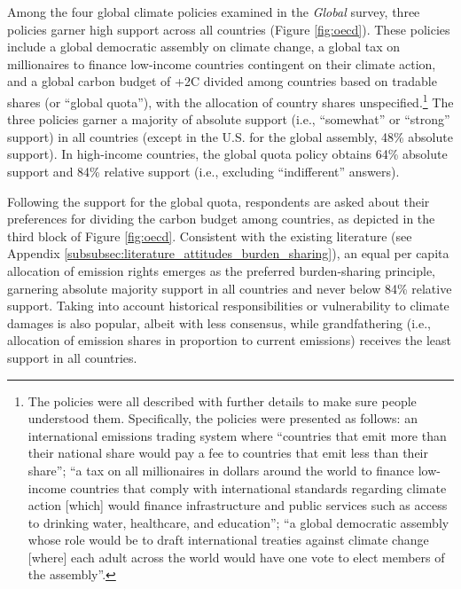Among the four global climate policies examined in the \textit{Global} survey, three policies garner high support across all countries (Figure \ref{fig:oecd}). These policies include a global democratic assembly on climate change, a global tax on millionaires to finance low-income countries contingent on their climate action, and a global carbon budget of +2\textdegree{}C divided among countries based on tradable shares (or ``global quota''), with the allocation of country shares unspecified.\footnote{The policies were all described with further details to make sure people understood them. Specifically, the policies were presented as follows: an international emissions trading system where ``countries that emit more than their national share would pay a fee to countries that emit less than their share''; ``a tax on all millionaires in dollars around the world to finance low-income countries that comply with international standards regarding climate action [which] would finance infrastructure and public services such as access to drinking water, healthcare, and education''; ``a global democratic assembly whose role would be to draft international treaties against climate change [where] each adult across the world would have one vote to elect members of the assembly''.} The three policies garner a majority of absolute support (i.e., ``somewhat'' or ``strong'' support) in all countries (except in the U.S. for the global assembly, 48\% absolute support). In high-income countries, the global quota policy obtains 64\% absolute support and 84\% relative support (i.e., excluding ``indifferent'' answers). %

Following the support for the global quota, respondents are asked about their preferences for dividing the carbon budget among countries, as depicted in the third block of Figure \ref{fig:oecd}. Consistent with the existing literature (see Appendix \ref{subsubsec:literature_attitudes_burden_sharing}), an equal per capita allocation of emission rights emerges as the preferred burden-sharing principle, garnering absolute majority support in all countries and never below 84\% relative support. Taking into account historical responsibilities or vulnerability to climate damages is also popular, albeit with less consensus, while grandfathering (i.e., allocation of emission shares in proportion to current emissions) receives the least support in all countries.

